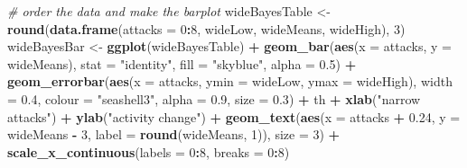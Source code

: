 \documentclass[10pt,]{scrartcl}
\newenvironment{Shaded}{\begin{snugshade}}{\end{snugshade}}
\newcommand{\KeywordTok}[1]{\textcolor[rgb]{0.13,0.29,0.53}{\textbf{#1}}}
\newcommand{\DataTypeTok}[1]{\textcolor[rgb]{0.13,0.29,0.53}{#1}}
\newcommand{\DecValTok}[1]{\textcolor[rgb]{0.00,0.00,0.81}{#1}}
\newcommand{\FloatTok}[1]{\textcolor[rgb]{0.00,0.00,0.81}{#1}}
\newcommand{\StringTok}[1]{\textcolor[rgb]{0.31,0.60,0.02}{#1}}
\newcommand{\CommentTok}[1]{\textcolor[rgb]{0.56,0.35,0.01}{\textit{#1}}}
\newcommand{\OperatorTok}[1]{\textcolor[rgb]{0.81,0.36,0.00}{\textbf{#1}}}
\newcommand{\NormalTok}[1]{#1}
\begin{document}
\begin{Shaded}
\begin{Highlighting}[]
\CommentTok{# order the data and make the barplot}
\NormalTok{wideBayesTable <-}\StringTok{ }\KeywordTok{round}\NormalTok{(}\KeywordTok{data.frame}\NormalTok{(}\DataTypeTok{attacks =} \DecValTok{0}\OperatorTok{:}\DecValTok{8}\NormalTok{, wideLow, wideMeans,}
\NormalTok{    wideHigh), }\DecValTok{3}\NormalTok{)}
\NormalTok{wideBayesBar <-}\StringTok{ }\KeywordTok{ggplot}\NormalTok{(wideBayesTable) }\OperatorTok{+}\StringTok{ }\KeywordTok{geom_bar}\NormalTok{(}\KeywordTok{aes}\NormalTok{(}\DataTypeTok{x =}\NormalTok{ attacks,}
    \DataTypeTok{y =}\NormalTok{ wideMeans), }\DataTypeTok{stat =} \StringTok{"identity"}\NormalTok{, }\DataTypeTok{fill =} \StringTok{"skyblue"}\NormalTok{, }\DataTypeTok{alpha =} \FloatTok{0.5}\NormalTok{) }\OperatorTok{+}
\StringTok{    }\KeywordTok{geom_errorbar}\NormalTok{(}\KeywordTok{aes}\NormalTok{(}\DataTypeTok{x =}\NormalTok{ attacks, }\DataTypeTok{ymin =}\NormalTok{ wideLow, }\DataTypeTok{ymax =}\NormalTok{ wideHigh),}
        \DataTypeTok{width =} \FloatTok{0.4}\NormalTok{, }\DataTypeTok{colour =} \StringTok{"seashell3"}\NormalTok{, }\DataTypeTok{alpha =} \FloatTok{0.9}\NormalTok{, }\DataTypeTok{size =} \FloatTok{0.3}\NormalTok{) }\OperatorTok{+}
\StringTok{    }\NormalTok{th }\OperatorTok{+}\StringTok{ }\KeywordTok{xlab}\NormalTok{(}\StringTok{"narrow attacks"}\NormalTok{) }\OperatorTok{+}\StringTok{ }\KeywordTok{ylab}\NormalTok{(}\StringTok{"activity change"}\NormalTok{) }\OperatorTok{+}\StringTok{ }\KeywordTok{geom_text}\NormalTok{(}\KeywordTok{aes}\NormalTok{(}\DataTypeTok{x =}\NormalTok{ attacks }\OperatorTok{+}
\StringTok{    }\FloatTok{0.24}\NormalTok{, }\DataTypeTok{y =}\NormalTok{ wideMeans }\OperatorTok{-}\StringTok{ }\DecValTok{3}\NormalTok{, }\DataTypeTok{label =} \KeywordTok{round}\NormalTok{(wideMeans, }\DecValTok{1}\NormalTok{)), }\DataTypeTok{size =} \DecValTok{3}\NormalTok{) }\OperatorTok{+}
\StringTok{    }\KeywordTok{scale_x_continuous}\NormalTok{(}\DataTypeTok{labels =} \DecValTok{0}\OperatorTok{:}\DecValTok{8}\NormalTok{, }\DataTypeTok{breaks =} \DecValTok{0}\OperatorTok{:}\DecValTok{8}\NormalTok{)}
\end{Highlighting}
\end{Shaded}

\footnotesize
\end{document}
